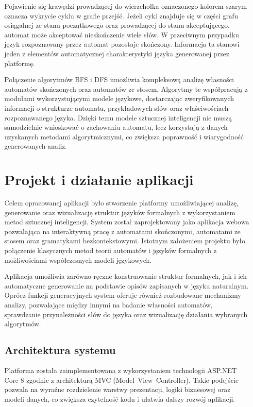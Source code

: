 \documentclass[12pt]{article}
\begin{document}
Pojawienie się krawędzi prowadzącej do wierzchołka oznaczonego kolorem szarym oznacza wykrycie cyklu w grafie przejść. Jeżeli cykl znajduje się w części grafu osiągalnej ze stanu początkowego oraz prowadzącej do stanu akceptującego, automat może akceptować nieskończenie wiele słów. W przeciwnym przypadku język rozpoznawany przez automat pozostaje skończony. Informacja ta stanowi jeden z elementów automatycznej charakterystyki języka generowanej przez platformę.

Połączenie algorytmów BFS i DFS umożliwia kompleksową analizę własności automatów skończonych oraz automatów ze stosem. Algorytmy te współpracują z modułami wykorzystującymi modele językowe, dostarczając zweryfikowanych informacji o strukturze automatu, przykładowych słów oraz właściwościach rozpoznawanego języka. Dzięki temu modele sztucznej inteligencji nie muszą samodzielnie wnioskować o zachowaniu automatu, lecz korzystają z danych uzyskanych metodami algorytmicznymi, co zwiększa poprawność i wiarygodność generowanych analiz.

\section{Projekt i działanie aplikacji}


Celem opracowanej aplikacji było stworzenie platformy umożliwiającej analizę, generowanie oraz wizualizację struktur języków formalnych z wykorzystaniem metod sztucznej inteligencji. System został zaprojektowany jako aplikacja webowa pozwalająca na interaktywną pracę z automatami skończonymi, automatami ze stosem oraz gramatykami bezkontekstowymi. Istotnym założeniem projektu było połączenie klasycznych metod teorii automatów i języków formalnych z możliwościami współczesnych modeli językowych.

Aplikacja umożliwia zarówno ręczne konstruowanie struktur formalnych, jak i ich automatyczne generowanie na podstawie opisów zapisanych w języku naturalnym. Oprócz funkcji generacyjnych system oferuje również rozbudowane mechanizmy analizy, pozwalające między innymi na badanie własności automatów, sprawdzanie przynależności słów do języka oraz wizualizację działania wybranych algorytmów.

\subsection{Architektura systemu} \cite{aspnetmvc2026,ollama2026}

Platforma została zaimplementowana z wykorzystaniem technologii ASP.NET Core 8 zgodnie z architekturą MVC (Model--View--Controller). Takie podejście pozwala na wyraźne rozdzielenie warstwy prezentacji, logiki biznesowej oraz modeli danych, co zwiększa czytelność kodu i ułatwia dalszy rozwój aplikacji.
\end{document}
